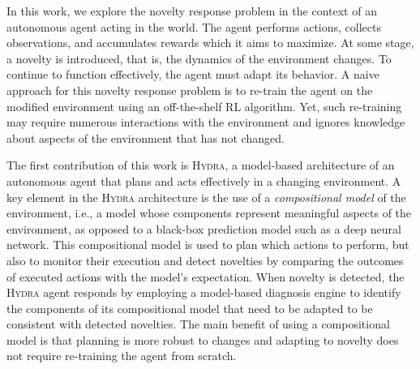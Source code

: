 \documentclass[letterpaper]{article} %
\newcommand{\hydra}{\textsc{Hydra}\xspace} %
\begin{document}
In this work, we explore the novelty response problem in the context of an autonomous agent acting in the world. 
The agent performs actions, collects observations, and accumulates rewards which it aims to maximize. 
At some stage, a novelty is introduced, that is, the dynamics of the environment changes. 
To continue to function effectively, the agent must adapt its behavior. 
A naive approach for this novelty response problem is to re-train the agent on the modified environment using an off-the-shelf RL algorithm. 
Yet, such re-training may require numerous interactions with the environment and ignores knowledge about aspects of the environment that has not changed. 


The first contribution of this work is \hydra, a model-based architecture of an autonomous agent that plans and acts effectively in a changing environment. 
A key element in the \hydra architecture is the use of a \emph{compositional model} of the environment, i.e., a model whose components represent meaningful aspects of the environment, as opposed to a black-box prediction model such as a deep neural network. 
This compositional model is used to plan which actions to perform, but also to monitor their execution and detect novelties by comparing the outcomes of executed actions with the model's expectation. 
When novelty is detected, the \hydra agent responds by employing a model-based diagnosis engine to identify the components of its compositional model that need to be adapted to be consistent with detected novelties. 
The main benefit of using a compositional model is that planning is more robust to changes and adapting to novelty does not require re-training the agent from scratch. 



\end{document}
